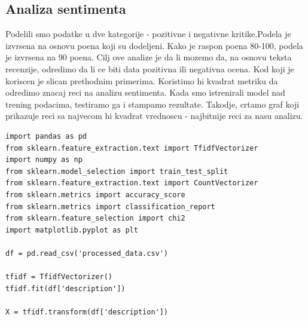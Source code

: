 \documentclass[11pt]{article} %
\begin{document}
\subsection{Analiza sentimenta}
Podelili smo podatke u dve kategorije - pozitivne i negativne kritike.Podela je izvrsena na osnovu poena koji su 
dodeljeni. Kako je raspon poena 80-100, podela je izvrsena na 90 poena. Cilj ove analize je da li mozemo da, na 
osnovu teksta recenzije, odredimo da li ce biti data pozitivna ili negativna ocena. Kod koji je koriscen je slican 
prethodnim primerima. Koristimo hi kvadrat metriku da odredimo znacaj reci na analizu sentimenta. Kada smo 
istrenirali model nad trening podacima, testiramo ga i stampamo rezultate. Takodje, crtamo graf koji prikazuje 
reci sa najvecom hi kvadrat vrednoscu - najbitnije reci za nasu analizu.
\begin{lstlisting}
import pandas as pd
from sklearn.feature_extraction.text import TfidfVectorizer
import numpy as np
from sklearn.model_selection import train_test_split
from sklearn.feature_extraction.text import CountVectorizer
from sklearn.metrics import accuracy_score
from sklearn.metrics import classification_report
from sklearn.feature_selection import chi2
import matplotlib.pyplot as plt

df = pd.read_csv('processed_data.csv')

tfidf = TfidfVectorizer()
tfidf.fit(df['description'])

X = tfidf.transform(df['description'])
\end{lstlisting}
\end{document}
